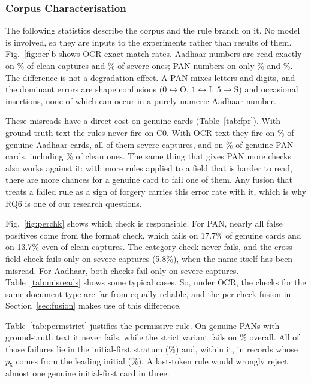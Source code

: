 \documentclass[12pt]{article}
\begin{document}
\subsubsection{Corpus Characterisation}
\label{subsec:characterisation}

The following statistics describe the corpus and the rule branch on
it. No model is involved, so they are inputs to the experiments rather
than results of them. Fig.~\ref{fig:ocr}b shows OCR exact-match rates.
Aadhaar numbers are read exactly on \dsOcrAadhaarAadhaarNumberClean\%
of clean captures and \dsOcrAadhaarAadhaarNumberSevere\% of severe
ones; PAN numbers on only \dsOcrPanPanNumberClean\% and
\dsOcrPanPanNumberSevere\%. The difference is not a degradation effect.
A PAN mixes letters and digits, and the dominant errors are shape
confusions ($0\!\leftrightarrow\!\mathrm{O}$, $1\!\leftrightarrow\!\mathrm{I}$,
$5\!\rightarrow\!\mathrm{S}$) and occasional insertions, none of which
can occur in a purely numeric Aadhaar number.


These misreads have a direct cost on genuine cards
(Table~\ref{tab:fpr}). With ground-truth text the rules never fire on
C0. With OCR text they fire on \dsFPAadhaarAll\% of genuine Aadhaar
cards, all of them severe captures, and on \dsFPPanAll\% of genuine PAN
cards, including \dsFPPanClean\% of clean ones. The same thing that gives PAN more checks also works against it: with more rules applied to a field that is harder to read, there are more chances for a genuine card to fail one of them. Any fusion that treats a failed rule as a sign of forgery carries this error rate with it, which is why RQ6 is one of our research questions.

Fig.~\ref{fig:perchk} shows which check is responsible. For PAN, nearly all false positives come from the format check, which fails on 17.7\% of genuine cards and on 13.7\% even of clean captures. The category check never fails, and the cross-field check fails only on severe captures (5.8\%), when the name itself has been misread. For Aadhaar, both checks fail only on severe captures. Table~\ref{tab:misreads} shows some typical cases. So, under OCR, the checks for the same document type are far from equally reliable, and the per-check fusion in Section~\ref{sec:fusion} makes use of this difference.




Table~\ref{tab:permstrict} justifies the permissive rule. On genuine
PANs with ground-truth text it never fails, while the strict variant
fails on \dsStrictAll\% overall. All of those failures lie in the
initial-first stratum (\dsStrictInitialFirst\%) and, within it, in
records whose $p_5$ comes from the leading initial
(\dsStrictLeadingInitial\%). A last-token rule would wrongly reject
almost one genuine initial-first card in three.
\end{document}
